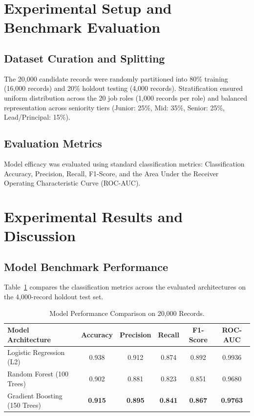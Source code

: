 \documentclass[conference]{IEEEtran}
\begin{document}
\section{Experimental Setup and Benchmark Evaluation}

\subsection{Dataset Curation and Splitting}
The 20,000 candidate records were randomly partitioned into 80\% training (16,000 records) and 20\% holdout testing (4,000 records). Stratification ensured uniform distribution across the 20 job roles (1,000 records per role) and balanced representation across seniority tiers (Junior: 25\%, Mid: 35\%, Senior: 25\%, Lead/Principal: 15\%).

\subsection{Evaluation Metrics}
Model efficacy was evaluated using standard classification metrics: Classification Accuracy, Precision, Recall, F1-Score, and the Area Under the Receiver Operating Characteristic Curve (ROC-AUC).

\section{Experimental Results and Discussion}

\subsection{Model Benchmark Performance}
Table~\ref{tab:c4_models} compares the classification metrics across the evaluated architectures on the 4,000-record holdout test set.

\begin{table}[htbp]
\caption{Model Performance Comparison on 20,000 Records.}
\begin{center}
\begin{tabular}{lccccc}
\toprule
\textbf{Model Architecture} & \textbf{Accuracy} & \textbf{Precision} & \textbf{Recall} & \textbf{F1-Score} & \textbf{ROC-AUC} \\
\midrule
Logistic Regression (L2)    & 0.938 & 0.912 & 0.874 & 0.892 & 0.9936 \\
Random Forest (100 Trees)   & 0.902 & 0.881 & 0.823 & 0.851 & 0.9680 \\
Gradient Boosting (150 Trees)& \textbf{0.915} & \textbf{0.895} & \textbf{0.841} & \textbf{0.867} & \textbf{0.9763} \\
\bottomrule
\end{tabular}
\label{tab:c4_models}
\end{center}
\end{table}
\end{document}
